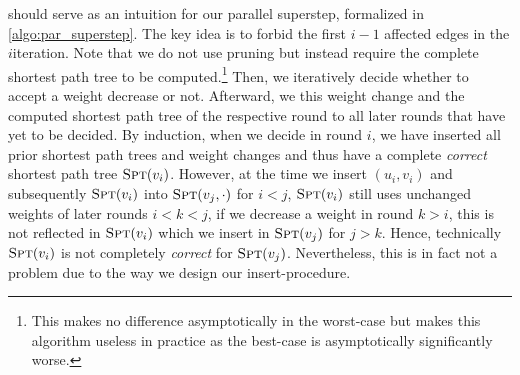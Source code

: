  should serve as an intuition for our parallel superstep, formalized in \cref{algo:par_superstep}.
The key idea is to forbid the first $i - 1$ affected edges in the $i$\th \algdk iteration.
Note that we do not use pruning but instead require the complete shortest path tree to be computed.\footnote{
    This makes no difference asymptotically in the worst-case but makes this algorithm useless in practice as the best-case is asymptotically significantly worse.
}
Then, we iteratively decide whether to accept a weight decrease or not.
Afterward, we  this weight change and the computed shortest path tree of the respective round to all later rounds that have yet to be decided.
By induction, when we decide in round $i$, we have inserted all prior shortest path trees and weight changes and thus have a complete \emph{correct} shortest path tree $\textsc{Spt}(v_i)$.
However, at the time we insert $(u_i,v_i)$ and subsequently $\textsc{Spt}(v_i)$ into $\textsc{Spt}(v_j, {\cdot})$ for $i < j$, $\textsc{Spt}(v_i)$ still uses unchanged weights of later rounds $i < k < j$, \ie if we decrease a weight in round $k > i$, this is not reflected in $\textsc{Spt}(v_i)$ which we insert in $\textsc{Spt}(v_j)$ for $j > k$.
Hence, technically $\textsc{Spt}(v_i)$ is not completely \emph{correct} for $\textsc{Spt}(v_j)$.
Nevertheless, this is in fact not a problem due to the way we design our insert-procedure.

\smallskip


